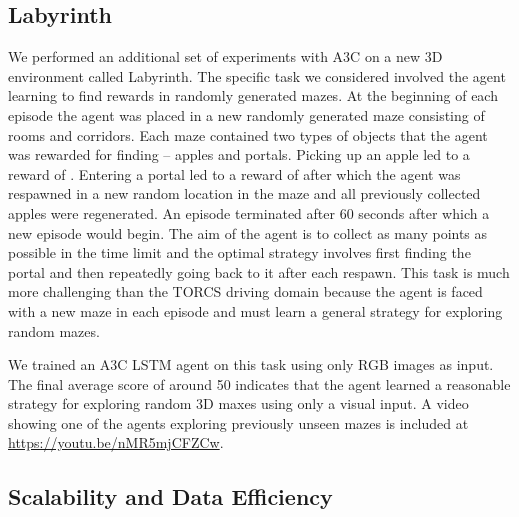 \documentclass{article} \usepackage{times}
\begin{document}
\subsection{Labyrinth}



We performed an additional set of experiments with A3C on a new 3D environment called Labyrinth.
The specific task we considered involved the agent learning to find rewards in randomly generated mazes.
At the beginning of each episode the agent was placed in a new randomly generated maze consisting of rooms and corridors.
Each maze contained two types of objects that the agent was rewarded for finding -- apples and portals.
Picking up an apple led to a reward of .  Entering a portal led to a reward of  after which the agent was respawned in a new random location in the maze and all previously collected apples were regenerated.
An episode terminated after 60 seconds after which a new episode would begin.
The aim of the agent is to collect as many points as possible in the time limit and the optimal strategy involves first finding the portal and then repeatedly going back to it after each respawn.
This task is much more challenging than the TORCS driving domain because the agent is faced with a new maze in each episode and must learn a general strategy for exploring random mazes.

We trained an A3C LSTM agent on this task using only  RGB images as input.
The final average score of around 50 indicates that the agent learned a reasonable strategy for exploring random 3D maxes using only a visual input.
A video showing one of the agents exploring previously unseen mazes is included at \url{https://youtu.be/nMR5mjCFZCw}.

\subsection{Scalability and Data Efficiency}
\end{document}
